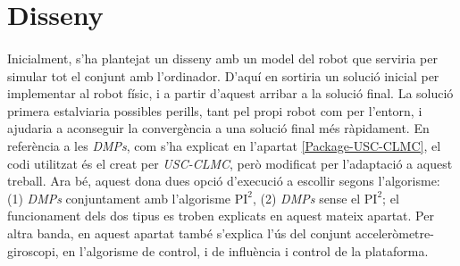 \documentclass[12pt,a4paper,final,twoside]{article}
\begin{document}

\newpage
\section{Disseny}

\paragraph{}Inicialment, s'ha plantejat un disseny amb un model del robot que serviria per simular tot el conjunt amb l'ordinador. D'aquí en sortiria un solució inicial per implementar al robot físic, i a partir d'aquest arribar a la solució final. La solució primera estalviaria possibles perills, tant pel propi robot com per l'entorn, i ajudaria a aconseguir la convergència a una solució final més ràpidament. En referència a les \textit{DMPs}, com s'ha explicat en l'apartat \ref{Package-USC-CLMC}, el codi utilitzat és el creat per \textit{USC-CLMC}, però modificat per l'adaptació a aquest treball. Ara bé, aquest dona dues opció d'execució a escollir segons l'algorisme: (1) \textit{DMPs} conjuntament amb l'algorisme $\mathrm{PI^2}$, (2) \textit{DMPs} sense el $\mathrm{PI^2}$; el funcionament dels dos tipus es troben explicats en aquest mateix apartat. Per altra banda, en aquest apartat també s'explica l'ús del conjunt acceleròmetre-giroscopi, en l'algorisme de control, i de influència i control de la plataforma.
\end{document}
